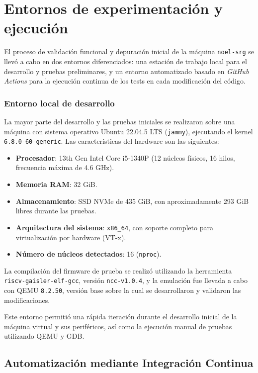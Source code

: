 \section{Entornos de experimentación y ejecución}
\label{subsec:entornos-experimentacion}

El proceso de validación funcional y depuración inicial de la máquina \texttt{noel-srg} se llevó a cabo en dos entornos diferenciados: una estación de trabajo local para el desarrollo y pruebas preliminares, y un entorno automatizado basado en \emph{GitHub Actions} para la ejecución continua de los tests en cada modificación del código.

\subsubsection*{Entorno local de desarrollo}

La mayor parte del desarrollo y las pruebas iniciales se realizaron sobre una máquina con sistema operativo Ubuntu 22.04.5 LTS (\texttt{jammy}), ejecutando el kernel \texttt{6.8.0-60-generic}. Las características del hardware son las siguientes:

\begin{itemize}
\item \textbf{Procesador}: 13th Gen Intel Core i5-1340P (12 núcleos físicos, 16 hilos, frecuencia máxima de 4.6 GHz).
\item \textbf{Memoria RAM}: 32 GiB.
\item \textbf{Almacenamiento}: SSD NVMe de 435 GiB, con aproximadamente 293 GiB libres durante las pruebas.
\item \textbf{Arquitectura del sistema}: \texttt{x86\_64}, con soporte completo para virtualización por hardware (VT-x).
\item \textbf{Número de núcleos detectados}: 16 (\texttt{nproc}).
\end{itemize}

La compilación del firmware de prueba se realizó utilizando la herramienta \texttt{riscv-gaisler-elf-gcc}, versión \texttt{ncc-v1.0.4}, y la emulación fue llevada a cabo con QEMU \texttt{8.2.50}, versión base sobre la cual se desarrollaron y validaron las modificaciones.

Este entorno permitió una rápida iteración durante el desarrollo inicial de la máquina virtual y sus periféricos, así como la ejecución manual de pruebas utilizando QEMU y GDB.

\subsection*{Automatización mediante Integración Continua}

